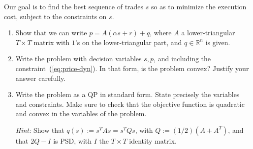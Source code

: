 \documentclass[11pt]{article}
\begin{document}
Our goal is to find the best sequence of trades $s$ so as to minimize the execution cost, subject to the constraints on $s$.
\begin{enumerate}
\item Show that we can write $p = A(\alpha s+r)+q$, where $A$ a lower-triangular $T \times T$ matrix with $1$'s on the lower-triangular part, and $q\in \mathbb{R}^{n}$ is given.

\item Write the problem with decision variables $s,p$, and including the constraint~(\ref{eq:price-dyn}). In that form, is the problem convex? Justify your answer carefully.

\item Write the problem as a QP in standard form. State precisely the variables and constraints.  Make sure to check that the objective function is quadratic and convex in the variables of the problem.

{\em Hint:} Show that $q(s) := s^T As = s^TQs$, with $Q := (1/2) (A+A^T)$, and that $2Q-I$ is PSD, with $I$ the $T \times T$ identity matrix.
\end{enumerate}
\end{document}
